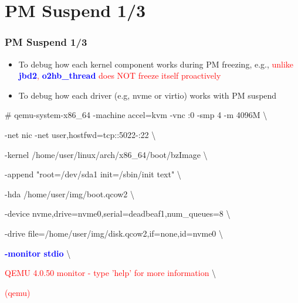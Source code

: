 \documentclass[aspectratio=169]{beamer}
\begin{document}
\section{PM Suspend 1/3}
\begin{frame}
\frametitle{PM Suspend 1/3}
\begin{itemize}
	\item To debug how each kernel component works during PM freezing, e.g., \textcolor{red}{unlike \textbf{\textcolor{blue}{jbd2}}, \textbf{\textcolor{blue}{o2hb\_thread}} does \textcolor{red}{NOT} freeze itself proactively}
\item To debug how each driver (e.g, nvme or virtio) works with PM suspend
\end{itemize}
\begin{block}{}

\# qemu-system-x86\_64 -machine accel=kvm -vnc :0 -smp 4 -m 4096M \textbackslash

-net nic -net user,hostfwd=tcp::5022-:22 \textbackslash

-kernel /home/user/linux/arch/x86\_64/boot/bzImage \textbackslash
	
-append "root=/dev/sda1 init=/sbin/init text" \textbackslash

-hda /home/user/img/boot.qcow2 \textbackslash

-device nvme,drive=nvme0,serial=deadbeaf1,num\_queues=8 \textbackslash

-drive file=/home/user/img/disk.qcow2,if=none,id=nvme0 \textbackslash

\textbf{\textcolor{blue}{-monitor stdio}} \textbackslash

\textcolor{red}{QEMU 4.0.50 monitor - type 'help' for more information} \textbackslash

\textcolor{red}{(qemu)}

\end{block}
\end{frame}

\end{document}
